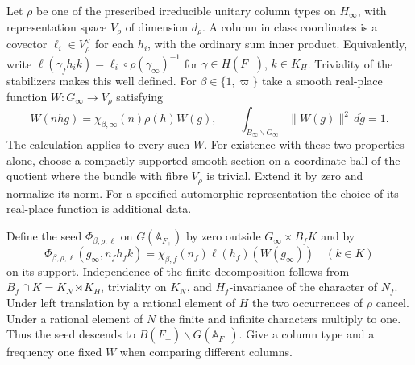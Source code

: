 \documentclass[a4paper,11pt]{article}
\theoremstyle{definition}
\theoremstyle{remark}
\numberwithin{equation}{section}
\begin{document}
Let \(\rho\) be one of the prescribed irreducible unitary column
types on \(H_\infty\), with representation space \(V_\rho\) of
dimension \(d_\rho\). A column in class coordinates is a covector
\(\ell_i\in V_\rho^\vee\) for each \(h_i\), with the ordinary sum
inner product. Equivalently, write
\(\ell(\gamma_f h_i k)=\ell_i\circ\rho(\gamma_\infty)^{-1}\)
for \(\gamma\in H(F_+)\), \(k\in K_H\). Triviality of the
stabilizers makes this well defined.
For \(\beta\in\{1,\varpi\}\) take a smooth real-place function
\(W:G_\infty\to V_\rho\) satisfying
\begin{equation}
 W(nhg)=\chi_{\beta,\infty}(n)\rho(h)W(g),\qquad
 \int_{B_\infty\backslash G_\infty}\|W(g)\|^2\,d\dot g=1 .
 \label{eq:real127}
\end{equation}
The calculation applies to every such \(W\). For existence with
these two properties alone, choose a compactly supported smooth
section on a coordinate ball of the quotient where the bundle
with fibre \(V_\rho\) is trivial. Extend it by zero and normalize
its norm. For a specified automorphic representation the choice of
its real-place function is additional data.

Define the seed \(\Phi_{\beta,\rho,\ell}\) on \(G(\mathbb A_{F_+})\)
by zero outside \(G_\infty\times B_fK\) and by
\begin{equation}
     \Phi_{\beta,\rho,\ell}(g_\infty,n_fh_fk)
            =\chi_{\beta,f}(n_f)\ell(h_f)(W(g_\infty))
            \quad(k\in K)
 \label{eq:seed127}
\end{equation}
on its support. Independence of the finite decomposition follows
from \(B_f\cap K=K_N\rtimes K_H\), triviality on \(K_N\), and
\(H_f\)-invariance of the character of \(N_f\). Under left
translation by a rational element of \(H\) the two occurrences
of \(\rho\) cancel. Under a rational element of \(N\) the finite
and infinite characters multiply to one. Thus the seed descends
to \(B(F_+)\backslash G(\mathbb A_{F_+})\). Give a column type
and a frequency one fixed \(W\) when comparing different columns.
\end{document}
